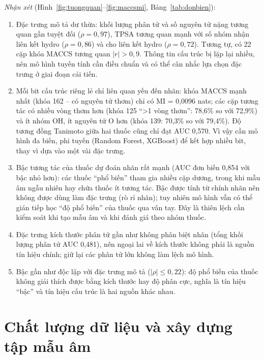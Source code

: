 \documentclass[12pt,a4paper,oneside]{report}
\begin{document}
\textit{Nhận xét} (Hình~\ref{fig:tuongquan}--\ref{fig:maccsmi}, Bảng~\ref{tab:donbien}):
\begin{enumerate}
  \item Đặc trưng mô tả dư thừa: khối lượng phân tử và số nguyên tử nặng
        tương quan gần tuyệt đối ($\rho=0{,}97$), TPSA tương quan mạnh với số nhóm
        nhận liên kết hydro ($\rho=0{,}86$) và cho liên kết hydro ($\rho=0{,}72$).
        Tương tự, có 22 cặp khóa MACCS tương quan $|r|>0{,}9$. Thông tin cấu trúc
        bị lặp lại nhiều, nên mô hình tuyến tính cần điều chuẩn và có thể cân
        nhắc lựa chọn đặc trưng ở giai đoạn cải tiến.
  \item Mỗi bit cấu trúc riêng lẻ chỉ liên quan yếu đến nhãn: khóa MACCS
        mạnh nhất (khóa 162 -- có nguyên tử thơm) chỉ có MI = 0,0096 nats; các cặp
        tương tác có nhiều vòng thơm hơn (khóa 125 ``>1 vòng thơm'': 78,6\% so
        với 72,9\%) và ít nhóm OH, ít nguyên tử O hơn (khóa 139: 70,3\% so với
        79,4\%). Độ tương đồng Tanimoto giữa hai thuốc cũng chỉ đạt AUC 0,570.
        Vì vậy cần mô hình đa biến, phi tuyến (Random Forest, XGBoost) để kết hợp
        nhiều bit, thay vì dựa vào một vài đặc trưng.
  \item Bậc tương tác của thuốc dự đoán nhãn rất mạnh (AUC đơn biến 0,854
        với bậc nhỏ hơn): các thuốc ``phổ biến'' tham gia nhiều cặp dương, trong
        khi mẫu âm ngẫu nhiên hay chứa thuốc ít tương tác. Bậc được tính từ chính
        nhãn nên không được dùng làm đặc trưng (rò rỉ nhãn); tuy nhiên mô
        hình vẫn có thể gián tiếp học ``độ phổ biến'' của thuốc qua vân tay. Đây là
        thiên lệch cần kiểm soát khi tạo mẫu âm và khi đánh giá theo nhóm thuốc.
  \item Đặc trưng kích thước phân tử gần như không phân biệt nhãn (tổng
        khối lượng phân tử AUC 0,481), nên ngoại lai về kích thước không phải là
        nguồn tín hiệu chính; giữ lại các phân tử lớn không làm lệch mô hình.
  \item Bậc gần như độc lập với đặc trưng mô tả ($|\rho|\leq0{,}22$): độ
        phổ biến của thuốc không giải thích được bằng kích thước hay độ phân cực,
        nghĩa là tín hiệu ``bậc'' và tín hiệu cấu trúc là hai nguồn khác nhau.
\end{enumerate}

\section{Chất lượng dữ liệu và xây dựng tập mẫu âm}
\label{sec:chatluong}
\end{document}
